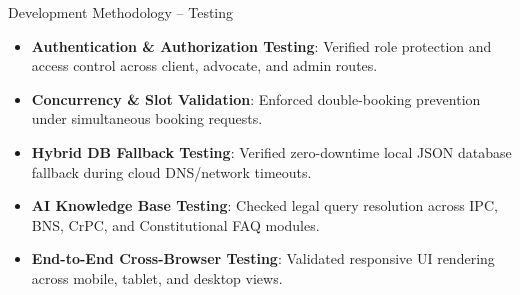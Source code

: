 \documentclass[10pt,aspectratio=169]{beamer}
\begin{document}
\begin{frame}{Development Methodology -- Testing}
  \begin{itemize}
    \setlength{\itemsep}{10pt}
    \item \textbf{Authentication & Authorization Testing}: Verified role protection and access control across client, advocate, and admin routes.
    \item \textbf{Concurrency & Slot Validation}: Enforced double-booking prevention under simultaneous booking requests.
    \item \textbf{Hybrid DB Fallback Testing}: Verified zero-downtime local JSON database fallback during cloud DNS/network timeouts.
    \item \textbf{AI Knowledge Base Testing}: Checked legal query resolution across IPC, BNS, CrPC, and Constitutional FAQ modules.
    \item \textbf{End-to-End Cross-Browser Testing}: Validated responsive UI rendering across mobile, tablet, and desktop views.
  \end{itemize}
\end{frame}
\end{document}
